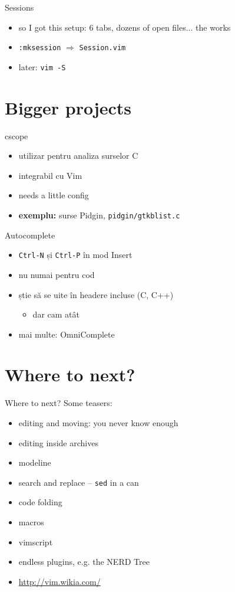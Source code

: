 \documentclass{beamer}
\begin{document}
\begin{frame}{Sessions}
  \begin{itemize}
    \item so I got this setup: 6 tabs, dozens of open files... the works
    \item \texttt{:mksession} $\Rightarrow$ \texttt{Session.vim}
    \item later: \texttt{vim -S}
  \end{itemize}
\end{frame}

\section{Bigger projects}
\begin{frame}{cscope}
  \begin{itemize}
    \item utilizar pentru analiza surselor C
    \item integrabil cu Vim
    \item needs a little config
    \pause
    \item \textbf{exemplu:} surse Pidgin, \texttt{pidgin/gtkblist.c}
  \end{itemize}
\end{frame}

\begin{frame}{Autocomplete}
  \begin{itemize}
    \item \texttt{Ctrl-N} și \texttt{Ctrl-P} în mod Insert
    \item nu numai pentru cod
    \item știe să se uite în headere incluse (C, C++)
    \pause
      \begin{itemize}
        \item dar cam atât
      \end{itemize}
    \pause
    \item mai multe: OmniComplete
  \end{itemize}
\end{frame}

\section{Where to next?}
\begin{frame}{Where to next?}
  Some teasers:
  \begin{itemize}
    \item editing and moving: you never know enough
    \item editing inside archives
    \item modeline
    \item search and replace -- \texttt{sed} in a can
    \item code folding
    \item macros
    \item vimscript
    \item endless plugins, e.g. the NERD Tree
    \item \url{http://vim.wikia.com/}
  \end{itemize}
\end{frame}
\end{document}
